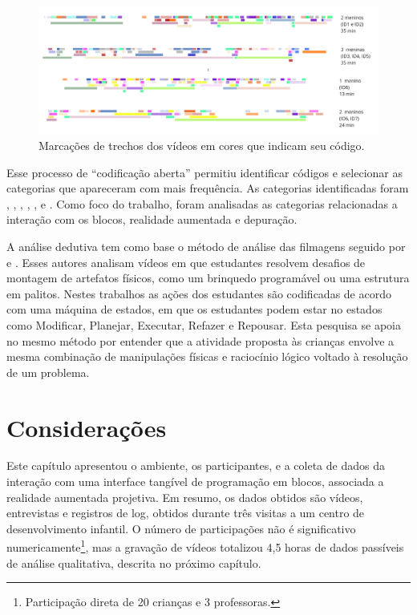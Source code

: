 \begin{figure}
    \centering
    \includegraphics[width=1\linewidth,fbox]{figs/codificacao_aberta.png}
    \caption{Marcações de trechos dos vídeos em cores que indicam seu código.}
    \sourceauthor
    \label{fig:codificacao}
\end{figure}

Esse processo de “codificação aberta” permitiu identificar códigos e selecionar as categorias que apareceram com mais frequência. As categorias identificadas foram , , , , ,  e . Como foco do trabalho, foram analisadas as categorias relacionadas a interação com os blocos, realidade aumentada e depuração. 


A análise dedutiva tem como base o método de análise das filmagens seguido por  e . Esses autores analisam vídeos em que estudantes resolvem desafios de montagem de artefatos físicos, como um brinquedo programável ou uma estrutura em palitos. Nestes trabalhos as ações dos estudantes são codificadas de acordo com uma máquina de estados, em que os estudantes podem estar no estados como Modificar, Planejar, Executar, Refazer e Repousar. Esta pesquisa se apoia no mesmo método por entender que a atividade proposta às crianças envolve a mesma combinação de manipulações físicas e raciocínio lógico voltado à resolução de um problema.

\section{Considerações}

Este capítulo apresentou o ambiente, os participantes, e a coleta de dados da interação com uma interface tangível de programação em blocos, associada a realidade aumentada projetiva. Em resumo, os dados obtidos são vídeos, entrevistas e registros de log, obtidos durante três visitas a um centro de desenvolvimento infantil. O número de participações não é significativo numericamente\footnote{Participação direta de 20 crianças e 3 professoras.}, mas a gravação de vídeos totalizou 4,5 horas de dados passíveis de análise qualitativa, descrita no próximo capítulo.